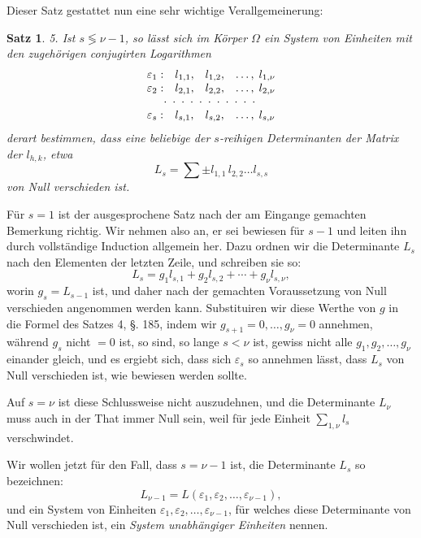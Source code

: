 \documentclass[12pt,a4paper]{article}
\newtheorem*{satz}{Satz}
\begin{document}
Dieser Satz gestattet nun eine sehr wichtige Verallgemeinerung:

\begin{satz}
5. Ist $s \lessgtr \nu - 1$, so lässt sich im Körper $\Omega$ ein System von Einheiten mit den zugehörigen conjugirten Logarithmen
\begin{equation}\label{eq:186-1}
\begin{array}{llll}
\varepsilon_1 : & l_{1,1}, & l_{1,2}, & \ldots,\; l_{1,\nu}\\
\varepsilon_2 : & l_{2,1}, & l_{2,2}, & \ldots,\; l_{2,\nu}\\
\multicolumn{4}{c}{\cdot\;\cdot\;\cdot\;\cdot\;\cdot\;\cdot\;\cdot\;\cdot\;\cdot\;\cdot\;\cdot\;}\\
\varepsilon_s : & l_{s,1}, & l_{s,2}, & \ldots,\; l_{s,\nu}
\end{array}
\end{equation}
derart bestimmen, dass eine beliebige der $s$-reihigen Determinanten der Matrix der $l_{h,k}$, etwa
\[
L_s = \sum \pm l_{1,1}\,l_{2,2} \ldots l_{s,s}
\]
von Null verschieden ist.
\end{satz}

Für $s = 1$ ist der ausgesprochene Satz nach der am Eingange gemachten Bemerkung richtig. Wir nehmen also an, er sei bewiesen für $s - 1$ und leiten ihn durch vollständige Induction allgemein her. Dazu ordnen wir die Determinante $L_s$ nach den Elementen der letzten Zeile, und schreiben sie so:
\begin{equation}\label{eq:186-2}
L_s = g_1 l_{s,1} + g_2 l_{s,2} + \cdots + g_\nu l_{s,\nu},
\end{equation}
worin $g_s = L_{s-1}$ ist, und daher nach der gemachten Voraussetzung von Null verschieden angenommen werden kann. Substituiren wir diese Werthe von $g$ in die Formel des Satzes 4, \S. 185, indem wir $g_{s+1} = 0, \ldots, g_\nu = 0$ annehmen, während $g_s$ nicht $= 0$ ist, so sind, so lange $s < \nu$ ist, gewiss nicht alle $g_1, g_2, \ldots, g_\nu$ einander gleich, und es ergiebt sich, dass sich $\varepsilon_s$ so annehmen lässt, dass $L_s$ von Null verschieden ist, wie bewiesen werden sollte.

Auf $s = \nu$ ist diese Schlussweise nicht auszudehnen, und die Determinante $L_\nu$ muss auch in der That immer Null sein, weil für jede Einheit $\sum\limits_{1,\nu} l_s$ verschwindet.

Wir wollen jetzt für den Fall, dass $s = \nu - 1$ ist, die Determinante $L_s$ so bezeichnen:
\begin{equation}\label{eq:186-3}
L_{\nu-1} = L(\varepsilon_1, \varepsilon_2, \ldots, \varepsilon_{\nu-1}),
\end{equation}
und ein System von Einheiten $\varepsilon_1, \varepsilon_2, \ldots, \varepsilon_{\nu-1}$, für welches diese Determinante von Null verschieden ist, ein \emph{System unabhängiger Einheiten} nennen.
\end{document}
